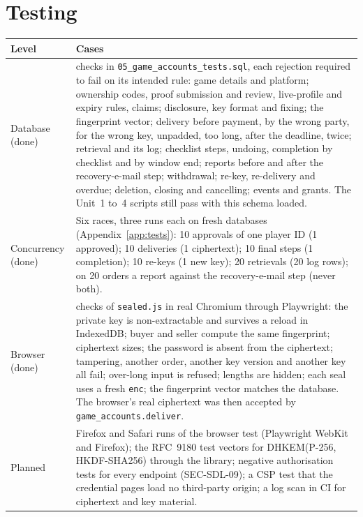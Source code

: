 \documentclass[11pt,a4paper]{article}
\newenvironment{dtable}[1]{\small\begin{longtable}{#1}}{\end{longtable}}
\begin{document}
\section{Testing}
\label{sec:testing}
\begin{dtable}{@{}>{\raggedright\arraybackslash}p{3.2cm}>{\raggedright\arraybackslash}p{12cm}@{}}
\toprule
\textbf{Level} & \textbf{Cases} \\ \midrule \endhead
Database (done) & 70 checks in \texttt{05\_game\_accounts\_tests.sql}, each rejection required to fail on its intended rule: game details and platform; ownership codes, proof submission and review, live-profile and expiry rules, claims; disclosure, key format and fixing; the fingerprint vector; delivery before payment, by the wrong party, for the wrong key, unpadded, too long, after the deadline, twice; retrieval and its log; checklist steps, undoing, completion by checklist and by window end; reports before and after the recovery-e-mail step; withdrawal; re-key, re-delivery and overdue; deletion, closing and cancelling; events and grants. The Unit~1 to~4 scripts still pass with this schema loaded. \\
Concurrency (done) & Six races, three runs each on fresh databases (Appendix~\ref{app:tests}): 10 approvals of one player ID (1 approved); 10 deliveries (1 ciphertext); 10 final steps (1 completion); 10 re-keys (1 new key); 20 retrievals (20 log rows); on 20 orders a report against the recovery-e-mail step (never both). \\
Browser (done) & 14 checks of \texttt{sealed.js} in real Chromium through Playwright: the private key is non-extractable and survives a reload in IndexedDB; buyer and seller compute the same fingerprint; ciphertext sizes; the password is absent from the ciphertext; tampering, another order, another key version and another key all fail; over-long input is refused; lengths are hidden; each seal uses a fresh \texttt{enc}; the fingerprint vector matches the database. The browser's real ciphertext was then accepted by \texttt{game\_accounts.deliver}. \\
Planned & Firefox and Safari runs of the browser test (Playwright WebKit and Firefox); the RFC~9180 test vectors for DHKEM(P-256, HKDF-SHA256) through the library; negative authorisation tests for every endpoint (SEC-SDL-09); a CSP test that the credential pages load no third-party origin; a log scan in CI for ciphertext and key material. \\
\bottomrule
\end{dtable}
\end{document}
